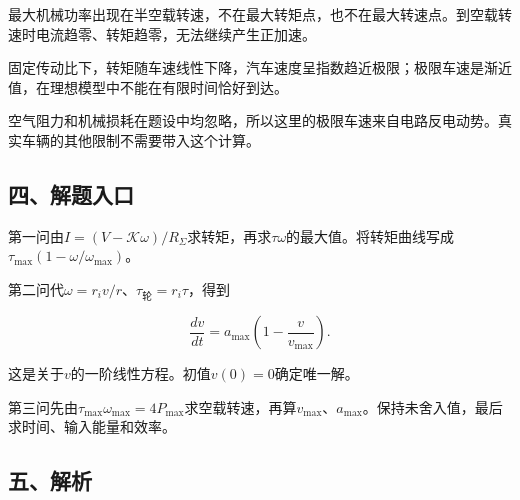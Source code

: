 \documentclass[12pt,a4paper,fontset=fandol]{ctexart}
\begin{document}
最大机械功率出现在半空载转速，不在最大转矩点，也不在最大转速点。到空载转速时电流趋零、转矩趋零，无法继续产生正加速。

固定传动比下，转矩随车速线性下降，汽车速度呈指数趋近极限；极限车速是渐近值，在理想模型中不能在有限时间恰好到达。

\begin{center}
\begin{minipage}{\linewidth}
\centering\begingroup{}
\ifdim\wd\diagrambox>.88\linewidth
\sbox{\diagrambox}{\resizebox{.88\linewidth}{!}{\usebox{\diagrambox}}}\fi
\ifdim\ht\diagrambox>.38\textheight
\resizebox{!}{.38\textheight}{\usebox{\diagrambox}}
\else\usebox{\diagrambox}\fi
\par{}\endgroup\end{minipage}\end{center}

空气阻力和机械损耗在题设中均忽略，所以这里的极限车速来自电路反电动势。真实车辆的其他限制不需要带入这个计算。

\subsection{四、解题入口}\label{ux56dbux89e3ux9898ux5165ux53e3-7}

第一问由\(I=(V-\mathcal K\omega)/R_\Sigma\)求转矩，再求\(\tau\omega\)的最大值。将转矩曲线写成\(\tau_{\max}(1-\omega/\omega_{\max})\)。

第二问代\(\omega=r_iv/r\)、\(\tau_{\text{轮}}=r_i\tau\)，得到

\[
\frac{dv}{dt}=a_{\max}\left(1-\frac v{v_{\max}}\right).
\]

这是关于\(v\)的一阶线性方程。初值\(v(0)=0\)确定唯一解。

第三问先由\(\tau_{\max}\omega_{\max}=4P_{\max}\)求空载转速，再算\(v_{\max}\)、\(a_{\max}\)。保持未舍入值，最后求时间、输入能量和效率。

\subsection{五、解析}\label{ux4e94ux89e3ux6790-7}
\end{document}
